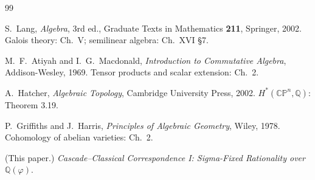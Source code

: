 \documentclass[11pt, a4paper]{amsart}
\theoremstyle{definition}
\newcommand{\Q}{\mathbb{Q}}
\newcommand{\CP}{\mathbb{CP}}
\begin{document}
\begin{thebibliography}{99}

S.~Lang, \emph{Algebra}, 3rd ed., Graduate Texts in Mathematics
\textbf{211}, Springer, 2002. Galois theory: Ch.~V;
semilinear algebra: Ch.~XVI \S 7.

M.~F.~Atiyah and I.~G.~Macdonald, \emph{Introduction to Commutative
Algebra}, Addison-Wesley, 1969. Tensor products and scalar
extension: Ch.~2.

A.~Hatcher, \emph{Algebraic Topology}, Cambridge University Press,
2002. $H^*(\CP^n, \Q)$: Theorem 3.19.

P.~Griffiths and J.~Harris, \emph{Principles of Algebraic Geometry},
Wiley, 1978. Cohomology of abelian varieties: Ch.~2.

(This paper.)
\emph{Cascade--Classical Correspondence I: Sigma-Fixed Rationality
over $\Q(\varphi)$}.

\end{thebibliography}
\end{document}
